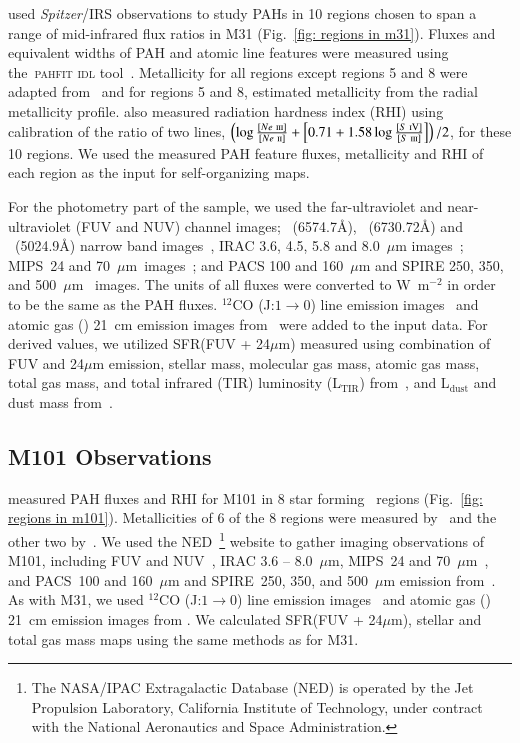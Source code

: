      \cite{Dim15} used {\it Spitzer}/IRS observations to study PAHs in 10 regions chosen to span a range of mid-infrared flux ratios in M31 (Fig.~\ref{fig: regions in m31}). 
     Fluxes and equivalent widths of PAH and atomic line features were measured using the~\textsc{pahfit idl} tool~\citep{Smith07b}.
     Metallicity for all regions except regions 5 and 8 were adapted from~\citep{Sanders12} and for regions 5 and 8, \cite{Dim15} estimated metallicity from the radial metallicity profile.
     \cite{Dim15} also measured radiation hardness index (RHI) using calibration of the ratio of two lines, $\left (\log \frac{[Ne~\textsc{iii}]}{[Ne~\textsc{ii}]} + \left [ 0.71 + 1.58\log\frac{[S~\textsc{iV}]}{[S~\textsc{iii}]} \right ] \right )/2$, for these 10 regions.
     We used the measured PAH feature fluxes, metallicity and RHI of each region as the input for self-organizing maps.
     
    For the photometry part of the sample, we used the \GALEX \citep{Martin05} far-ultraviolet and near-ultraviolet (FUV and NUV) channel images; \halpha~(6574.7\AA), \sii~(6730.72\AA) and \oiii~(5024.9\AA) narrow band images~\citep{Massey07}, IRAC 3.6, 4.5, 5.8 and 8.0~$\mu$m images~\citep{Barmby06}; MIPS~24 and 70~$\mu$m~images~\citep{Gordon06}; and PACS 100 and 160~$\mu$m and SPIRE 250, 350, and 500~$\mu$m~\citep{Fritz12} images.
     The units of all fluxes were converted to W~m$^{-2}$ in order to be the same as the PAH fluxes.
     $^{12}$CO (J:$1\rightarrow0$) line emission images~\citep{Nieten06} and atomic gas (\hi) 21~cm emission images from~\cite{Chemin09} were added to the input data. 
     For derived values, we utilized SFR(FUV + 24$\mu$m) measured using combination of FUV and 24$\mu$m emission, stellar mass, molecular gas mass, atomic gas mass, total gas mass, and total infrared (TIR) luminosity (L$_\mathrm{TIR}$) from~\cite{Rahmani16}, and L$_\mathrm{dust}$ and dust mass from~\cite{Draine14}.
     
    \subsection{M101 Observations}
    \label{Sec: data_M101_SOMN} 
    
     \cite{Gordon08} measured PAH fluxes and RHI for M101 in 8 star forming \hii~regions (Fig.~\ref{fig: regions in m101}).
     Metallicities of 6 of the 8 regions were measured by~\cite{Kennicutt03} and the other two by~\cite{Gordon08}.
     We used the NED~\footnote{The NASA/IPAC Extragalactic Database (NED) is operated by the Jet Propulsion Laboratory, California Institute of Technology, under contract with the National Aeronautics and Space Administration.} website to gather imaging observations of M101, including 
      \GALEX FUV and NUV~\citep{depaz07}, IRAC 3.6 -- 8.0~$\mu$m, MIPS~24 and 70~$\mu$m~\citep{Dale09}, and PACS~100 and 160~$\mu$m and SPIRE~250, 350, and 500~$\mu$m emission from~\cite{Kennicutt11}.
     As with M31, we used $^{12}$CO (J:$1\rightarrow0$) line emission images~\citep{Helfer03} and atomic gas (\hi) 21~cm emission images from \cite{Walter08}.
     We calculated SFR(FUV + 24$\mu$m), stellar and total gas mass maps using the same methods as for M31.
     
